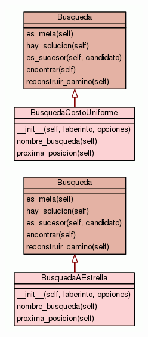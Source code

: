 \documentclass[letter, titlepage, 10pt]{article}
\begin{document}
    \begin{figure}[H]
  \centering
    \begin{minipage}{.5\textwidth}
        \centering
        \includegraphics[width=0.5\linewidth]{images/diagram_bcu}
    \end{minipage}%
    \begin{minipage}{.5\textwidth}
        \centering
        \includegraphics[width=0.5\linewidth]{images/diagram_bae}
    \end{minipage}
\end{figure}
\end{document}

